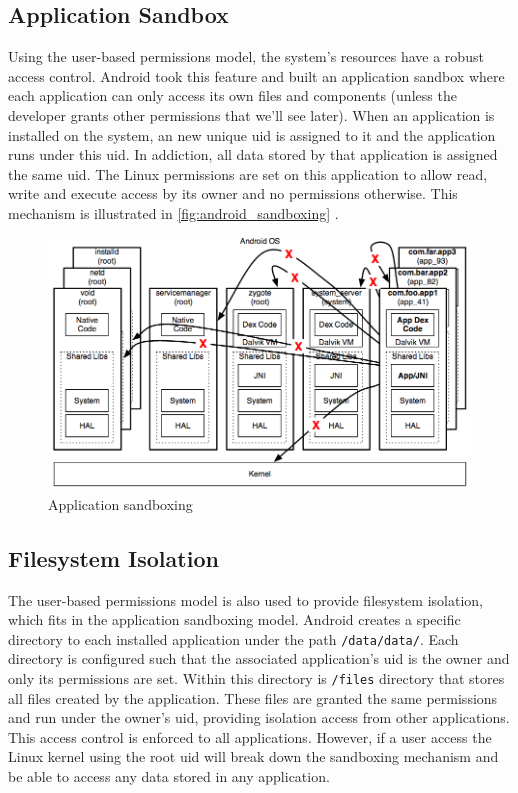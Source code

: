 \subsection{Application Sandbox}

Using the user-based permissions model, the system's resources have a robust access control. Android took this feature and built an application sandbox where each application can only access its own files and components (unless the developer grants other permissions that we'll see later). When an application is installed on the system, an new unique \gls{uid} is assigned to it and the application runs under this \gls{uid}. In addiction, all data stored by that application is assigned the same \gls{uid}. The Linux permissions are set on this application to allow read, write and execute access by its owner and no permissions otherwise. This mechanism is illustrated in \autoref{fig:android_sandboxing} \cite{AndroidSecurityUnderpinnings}.

\begin{figure}[h]
 \begin{center}
 \includegraphics[scale=0.5]{figures/android_security.png}
 \end{center}
 \caption{Application sandboxing}
 \label{fig:android_sandboxing}
\end{figure}

\subsection{Filesystem Isolation}

The user-based permissions model is also used to provide filesystem isolation, which fits in the application sandboxing model. Android creates a specific directory to each installed application under the path \texttt{/data/data/}. Each directory is configured such that the associated application's \gls{uid} is the owner and only its permissions are set. Within this directory is \texttt{/files} directory that stores all files created by the application. These files are granted the same permissions and run under the owner's \gls{uid}, providing isolation access from other applications. This access control is enforced to all applications. However, if a user access the Linux kernel using the root \gls{uid} will break down the sandboxing mechanism and be able to access any data stored in any application.

